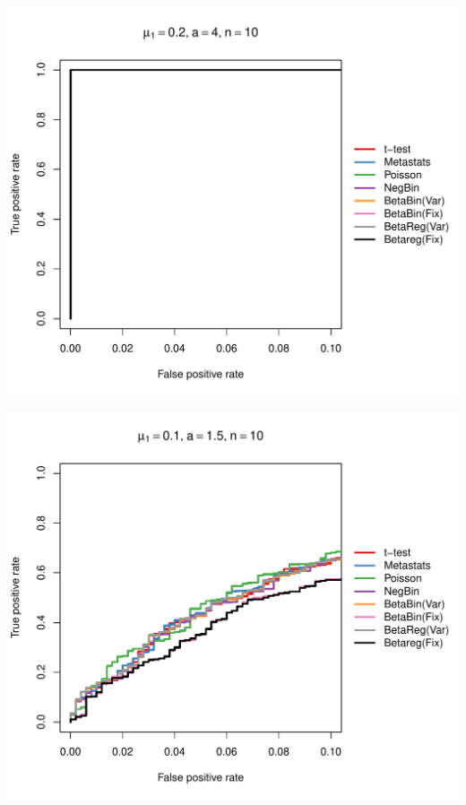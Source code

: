 \documentclass[12pt]{article}\usepackage{graphicx, color}
\makeatletter
\def\maxwidth{ %
  \ifdim\Gin@nat@width>\linewidth
    \linewidth
  \else
    \Gin@nat@width
  \fi
}
\newenvironment{knitrout}{}{} %
\makeatother
\begin{document}
\begin{knitrout}
{\centering \includegraphics[width=\maxwidth]{figure/rocs15} 

}




{\centering \includegraphics[width=\maxwidth]{figure/rocs16} 

}





\end{knitrout}
\end{document}

